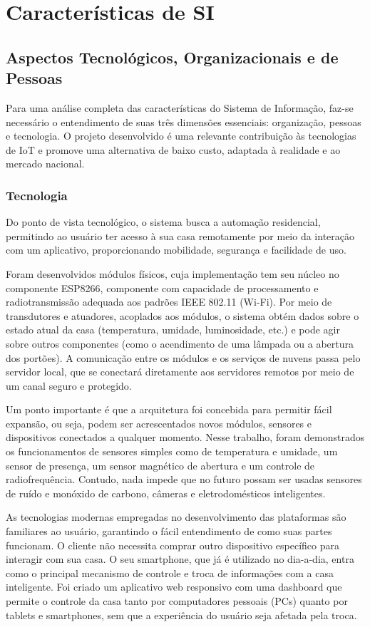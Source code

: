 \chapter{Características de SI}

\section{Aspectos Tecnológicos, Organizacionais e de Pessoas}

Para uma análise completa das características do Sistema de Informação, faz-se necessário o entendimento de suas três dimensões essenciais: organização, pessoas e tecnologia. O projeto desenvolvido é uma relevante contribuição às tecnologias de IoT e promove uma alternativa de baixo custo, adaptada à realidade e ao mercado nacional.

\subsection{Tecnologia}

Do ponto de vista tecnológico, o sistema busca a automação residencial, permitindo ao usuário ter acesso à sua casa remotamente por meio da interação com um aplicativo, proporcionando mobilidade, segurança e facilidade de uso.

Foram desenvolvidos módulos físicos, cuja implementação tem seu núcleo no componente ESP8266, componente com capacidade de processamento e radiotransmissão adequada aos padrões IEEE 802.11 (Wi-Fi). Por meio de transdutores e atuadores, acoplados aos módulos, o sistema obtém dados sobre o estado atual da casa (temperatura, umidade, luminosidade, etc.) e pode agir sobre outros componentes (como o acendimento de uma lâmpada ou a abertura dos portões). A comunicação entre os módulos e os serviços de nuvens passa pelo servidor local, que se conectará diretamente aos servidores remotos por meio de um canal seguro e protegido.

Um ponto importante é que a arquitetura foi concebida para permitir fácil expansão, ou seja, podem ser acrescentados novos módulos, sensores e dispositivos conectados a qualquer momento. Nesse trabalho, foram demonstrados os funcionamentos de sensores simples como de temperatura e umidade, um sensor de presença, um sensor magnético de abertura e um controle de radiofrequência. Contudo, nada impede que no futuro possam ser usadas sensores de ruído e monóxido de carbono, câmeras e eletrodomésticos inteligentes.

As tecnologias modernas empregadas no desenvolvimento das plataformas são familiares ao usuário, garantindo o fácil entendimento de como suas partes funcionam. O cliente não necessita comprar outro dispositivo específico para interagir com sua casa. O seu smartphone, que já é utilizado no dia-a-dia, entra como o principal mecanismo de controle e troca de informações com a casa inteligente. Foi criado um aplicativo web responsivo com uma dashboard que permite o controle da casa tanto por computadores pessoais (PCs) quanto por tablets e smartphones, sem que a experiência do usuário seja afetada pela troca.

